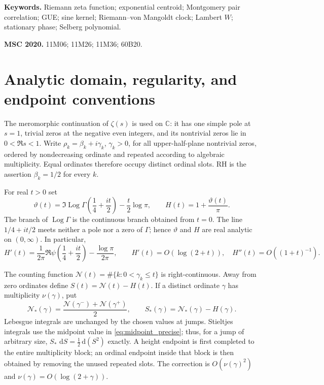 \documentclass[11pt]{amsart}
\theoremstyle{definition}
\theoremstyle{remark}
\newcommand{\dd}{\,\mathrm d}
\newcommand{\Log}{\operatorname{Log}}
\begin{document}
\noindent\textbf{Keywords.} Riemann zeta function; exponential centroid;
Montgomery pair correlation; GUE; sine kernel; Riemann--von Mangoldt clock;
Lambert $W$; stationary phase; Selberg polynomial.

\medskip
\noindent\textbf{MSC 2020.} 11M06; 11M26; 11M36; 60B20.

\tableofcontents

\section{Analytic domain, regularity, and endpoint conventions}
\label{sec:conventions}

The meromorphic continuation of $\zeta(s)$ is used on $\mathbb C$: it has one
simple pole at $s=1$, trivial zeros at the negative even integers, and its
nontrivial zeros lie in $0<\Re s<1$.  Write
$\rho_k=\beta_k+i\gamma_k$, $\gamma_k>0$, for all upper-half-plane
nontrivial zeros, ordered by nondecreasing ordinate and repeated according to
algebraic multiplicity.  Equal ordinates therefore occupy distinct ordinal
slots.  RH is the assertion $\beta_k=1/2$ for every $k$.

For real $t>0$ set
\begin{equation}\label{eq:theta_exact}
\vartheta(t)=\Im\Log\Gamma\!\left(\frac14+\frac{it}{2}\right)
-\frac t2\log\pi,
\qquad H(t)=1+\frac{\vartheta(t)}{\pi}.
\end{equation}
The branch of $\Log\Gamma$ is the continuous branch obtained from $t=0$.
The line $1/4+it/2$ meets neither a pole nor a zero of $\Gamma$; hence
$\vartheta$ and $H$ are real analytic on $(0,\infty)$.  In particular,
\begin{equation}\label{eq:H_derivatives}
H'(t)=\frac1{2\pi}\Re\psi\!\left(\frac14+\frac{it}{2}\right)
-\frac{\log\pi}{2\pi},
\qquad H'(t)=O(\log(2+t)),\quad H''(t)=O((1+t)^{-1}).
\end{equation}

The counting function $\mathcal N(t)=\#\{k:0<\gamma_k\le t\}$ is
right-continuous.  Away from zero ordinates define $S(t)=\mathcal N(t)-H(t)$.
If a distinct ordinate $\gamma$ has multiplicity $\nu(\gamma)$, put
\begin{equation}\label{eq:midpoint_precise}
\mathcal N_*(\gamma)=\frac{\mathcal N(\gamma^-)+\mathcal N(\gamma^+)}2,
\qquad S_*(\gamma)=\mathcal N_*(\gamma)-H(\gamma).
\end{equation}
Lebesgue integrals are unchanged by the chosen values at jumps.  Stieltjes
integrals use the midpoint value in \eqref{eq:midpoint_precise}; thus, for a
jump of arbitrary size, $S_*\,\dd S=\tfrac12\dd(S^2)$ exactly.  A height
endpoint is first completed to the entire multiplicity block; an ordinal
endpoint inside that block is then obtained by removing the unused repeated
slots.  The correction is $O(\nu(\gamma)^2)$ and
$\nu(\gamma)=O(\log(2+\gamma))$.
\end{document}
